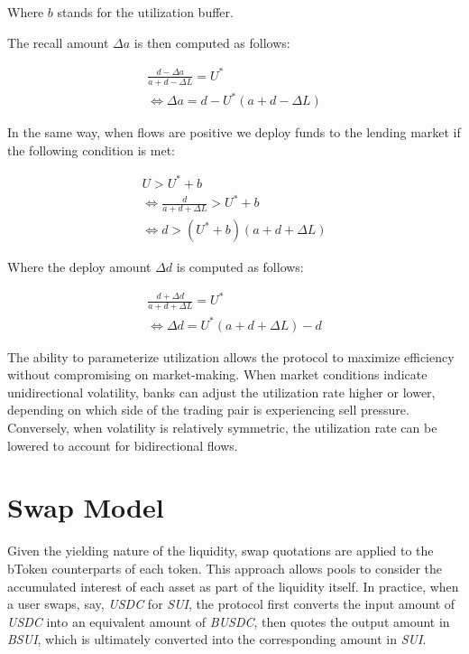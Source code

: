 \documentclass[sigconf,nonacm,prologue,table]{acmart}
\numberwithin{equation}{section}
\theoremstyle{definition}
\theoremstyle{remark}
\begin{document}
Where $b$ stands for the utilization buffer.

The recall amount $\Delta a$ is then computed as follows:

\begin{gather*}
    \frac{d - \Delta a}{a + d - \Delta L} = U^* \\
    \iff \Delta a = d - U^* (a + d - \Delta L)
\tag{2.2.3}
\end{gather*}

In the same way, when flows are positive we deploy funds to the lending market if the following condition is met:

\begin{gather*}
    U > U^* + b \\
    \iff \frac{d}{a + d + \Delta L} > U^* + b \\
    \iff d > (U^* + b)(a + d + \Delta L)
\tag{2.2.4}
\end{gather*}

Where the deploy amount $\Delta d$ is computed as follows:

\begin{gather*}
    \frac{d + \Delta d}{a + d + \Delta L} = U^* \\
    \iff \Delta d = U^* (a + d + \Delta L) - d
\tag{2.2.5}
\end{gather*}

The ability to parameterize utilization allows the protocol to maximize efficiency without compromising on market-making. When market conditions indicate unidirectional volatility, banks can adjust the utilization rate higher or lower, depending on which side of the trading pair is experiencing sell pressure. Conversely, when volatility is relatively symmetric, the utilization rate can be lowered to account for bidirectional flows.

\section{Swap Model}
\label{sec:swapmodel}

Given the yielding nature of the liquidity, swap quotations are applied to the bToken counterparts of each token. This approach allows pools to consider the accumulated interest of each asset as part of the liquidity itself. In practice, when a user swaps, say, \emph{USDC} for \emph{SUI}, the protocol first converts the input amount of \emph{USDC} into an equivalent amount of \emph{BUSDC}, then quotes the output amount in \emph{BSUI}, which is ultimately converted into the corresponding amount in \emph{SUI}.
\end{document}
